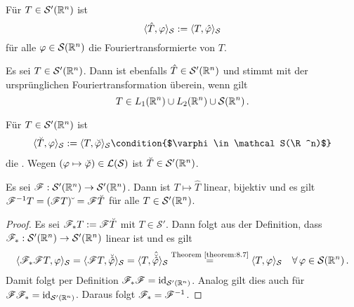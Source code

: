 \begin{defi}
  Für $T\in \mathcal S'(\mathbb{R}^n)$ ist
  \[ \langle\hat T,\varphi\rangle_{\mathcal S}:= \langle T,\hat\varphi\rangle_{\mathcal S} \]
  für alle $\varphi\in \mathcal S(\mathbb{R}^n)$ die Fouriertransformierte von $T$.
\end{defi}

\begin{bem}
  \label{bem:8.11}
  Es sei $T\in \mathcal S'(\mathbb{R}^n)$. Dann ist ebenfalls $\hat T\in\mathcal S'(\mathbb{R}^n)$ und stimmt mit der ursprünglichen Fouriertransformation überein, wenn gilt 
  \[
  	T\in L_1(\mathbb{R}^n)\cup L_2(\mathbb{R}^n)\cup \mathcal S(\mathbb{R}^n) \, .
\]
\end{bem}

\begin{defi}
  Für $T\in\mathcal S'(\mathbb{R}^n)$ ist
  \begin{align*}
    \<\breve T,\varphi\>_{\mathcal S}:=\<T,\breve\varphi\>_{\mathcal S}
    \condition{$\varphi\in \mathcal S(\R^n)$}
  \end{align*}
  die . Wegen $(\varphi\mapsto\breve\varphi)\in\mathcal{L}(\mathcal S)$ ist $\breve T\in \mathcal S'(\mathbb{R}^n)$.
\end{defi}

\begin{theorem}
  \label{theorem:8.12}
  Es sei $\mathscr{F}:\mathcal S'(\mathbb{R}^n)\rightarrow\mathcal  S'(\mathbb{R}^n)$. Dann ist $T\mapsto\hat T$ linear, bijektiv und es gilt $\mathscr{F}^{-1}T=(\mathscr{F} T)\breve{\hspace{1mm}}=\mathscr{F}\breve T$ für alle $T\in\mathcal  S'(\mathbb{R}^n)$.
\end{theorem}

\begin{proof}
 Es sei $\mathscr{F}_\ast T := \mathscr{F} \breve T$ mit $T \in \mathcal S'$. Dann folgt aus der Definition, dass $\mathscr{F}_\ast: \mathcal S'(\mathbb{R}^n) \rightarrow \mathcal S'(\mathbb{R}^n)$ linear ist und es gilt
 \begin{align*}
 	\langle\mathscr{F}_\ast \mathscr{F} T, \varphi\rangle_{\mathcal S} = \langle\mathscr{F} T, \breve{\hat\varphi}\rangle_{\mathcal S} = \langle T, \hat{\breve{\hat\varphi}} \rangle_{\mathcal S} \stackrel{\scriptsize\text{Theorem}~\ref{theorem:8.7}}= \langle T, \varphi\rangle_{\mathcal S} \quad \forall \, \varphi \in \mathcal S(\mathbb{R}^n) \, .
 \end{align*}
 Damit folgt per Definition $\mathscr{F}_\ast \mathscr{F} = \text{id}_{\mathcal S'(\mathbb{R}^n)}$. Analog gilt dies auch für $\mathscr{F} \mathscr{F}_\ast = \text{id}_{\mathcal S'(\mathbb{R}^n)}$. Daraus folgt $\mathscr{F}_\ast = \mathscr{F}^{-1}$.
\end{proof}


